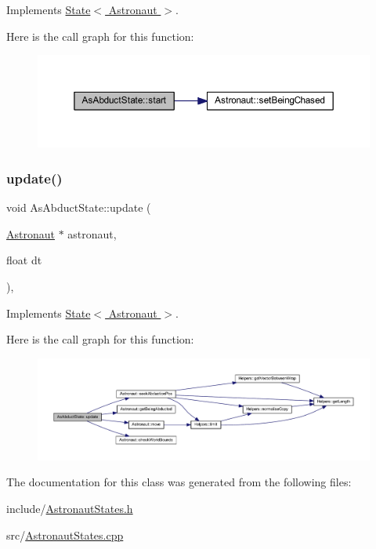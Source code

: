 Implements \hyperlink{class_state_abc29d36b0462a306ac9b32f36571d783}{State$<$ Astronaut $>$}.

Here is the call graph for this function\+:
\nopagebreak
\begin{figure}[H]
\begin{center}
\leavevmode
\includegraphics[width=350pt]{class_as_abduct_state_afad21e00707545b221d707932b22375e_cgraph}
\end{center}
\end{figure}
\mbox{\label{class_as_abduct_state_a5d1f94854fc9ef5e4cc35734ad691660}} 
\subsubsection{\texorpdfstring{update()}{update()}}
{\footnotesize\ttfamily void As\+Abduct\+State\+::update (\begin{DoxyParamCaption}\item[{\hyperlink{class_astronaut}{Astronaut} $\ast$}]{astronaut,  }\item[{float}]{dt }\end{DoxyParamCaption})\hspace{0.3cm}{\ttfamily [override]}, {\ttfamily [virtual]}}



Implements \hyperlink{class_state_a30b5f87ed3e3a05fafeaf898e43518ea}{State$<$ Astronaut $>$}.

Here is the call graph for this function\+:
\nopagebreak
\begin{figure}[H]
\begin{center}
\leavevmode
\includegraphics[width=350pt]{class_as_abduct_state_a5d1f94854fc9ef5e4cc35734ad691660_cgraph}
\end{center}
\end{figure}


The documentation for this class was generated from the following files\+:\begin{DoxyCompactItemize}
\item 
include/\hyperlink{_astronaut_states_8h}{Astronaut\+States.\+h}\item 
src/\hyperlink{_astronaut_states_8cpp}{Astronaut\+States.\+cpp}\end{DoxyCompactItemize}
